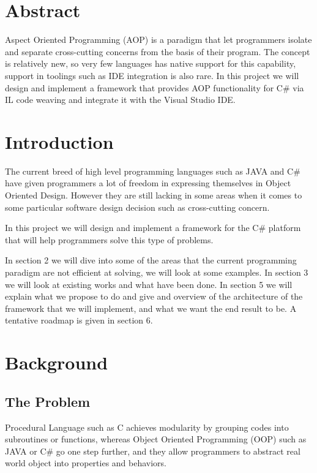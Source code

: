 \section*{Abstract}
Aspect Oriented Programming (AOP) is a paradigm that let programmers isolate and separate cross-cutting concerns from the basis of their program. The concept is relatively new, so very few languages has native support for this capability, support in toolings such as IDE integration is also rare. In this project we will design and implement a framework that provides AOP functionality for C\# via IL code weaving and integrate it with the Visual Studio IDE.
\vfill{}

\setcounter{page}{0} 
\newpage{}
\section{Introduction}
The current breed of high level programming languages such as JAVA and C\# have given programmers a lot of freedom in expressing themselves in Object Oriented Design. However they are still lacking in some areas when it comes to some particular software design decision such as cross-cutting concern. 

In this project we will design and implement a framework for the C\# platform that will help programmers solve this type of problems.

In section 2 we will dive into some of the areas that the current programming paradigm are not efficient at solving, we will look at some examples. In section 3 we will look at existing works and what have been done. In section 5 we will explain what we propose to do and give and overview of the architecture of the framework that we will implement, and what we want the end result to be. A tentative roadmap is given in section 6.

\section{Background}
\subsection{The Problem}
Procedural Language such as C achieves modularity by grouping codes into subroutines or functions, whereas Object Oriented Programming (OOP) such as JAVA or C\# go one step further, and they allow programmers to abstract real world object into properties and behaviors.

